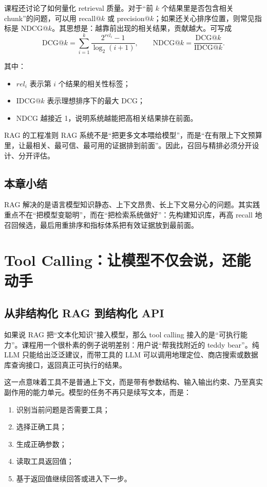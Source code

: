 \documentclass[a4paper]{article}
\begin{document}
课程还讨论了如何量化 retrieval 质量。对于“前 $k$ 个结果里是否包含相关 chunk”的问题，可以用 recall@$k$ 或 precision@$k$；如果还关心排序位置，则常见指标是 NDCG@$k$。其思想是：越靠前出现的相关结果，贡献越大。可写成
\[
\mathrm{DCG}@k = \sum_{i=1}^{k}\frac{2^{rel_i}-1}{\log_2(i+1)},
\qquad
\mathrm{NDCG}@k = \frac{\mathrm{DCG}@k}{\mathrm{IDCG}@k}.
\]

其中：
\begin{itemize}
\item $rel_i$ 表示第 $i$ 个结果的相关性标签；
\item $\mathrm{IDCG}@k$ 表示理想排序下的最大 DCG；
\item NDCG 越接近 1，说明系统越能把高相关结果排在前面。
\end{itemize}

\begin{knowledgebox}{RAG 的工程准则}
RAG 系统不是“把更多文本喂给模型”，而是“在有限上下文预算里，让最相关、最可信、最可用的证据排到前面”。因此，召回与精排必须分开设计、分开评估。
\end{knowledgebox}

\subsection{本章小结}

RAG 解决的是语言模型知识静态、上下文昂贵、长上下文易分心的问题。其实践重点不在“把模型变聪明”，而在“把检索系统做好”：先构建知识库，再高 recall 地召回候选，最后用重排序和指标体系把有效证据放到最前面。

\section{Tool Calling：让模型不仅会说，还能动手}

\subsection{从非结构化 RAG 到结构化 API}

如果说 RAG 把“文本化知识”接入模型，那么 tool calling 接入的是“可执行能力”。课程用一个很朴素的例子说明差别：用户说“帮我找附近的 teddy bear”。纯 LLM 只能给出泛泛建议，而带工具的 LLM 可以调用地理定位、商店搜索或数据库查询接口，返回真正可执行的结果。

这一点意味着工具不是普通上下文，而是带有参数结构、输入输出约束、乃至真实副作用的能力单元。模型的任务不再只是续写文本，而是：

\begin{enumerate}
\item 识别当前问题是否需要工具；
\item 选择正确工具；
\item 生成正确参数；
\item 读取工具返回值；
\item 基于返回值继续回答或进入下一步。
\end{enumerate}
\end{document}
